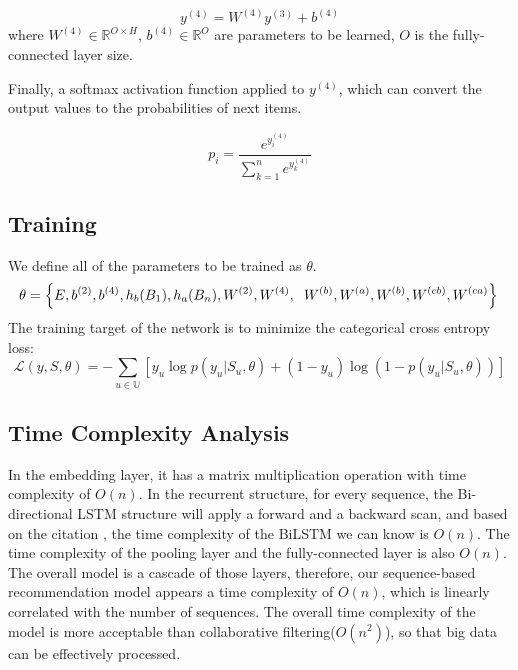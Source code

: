 \documentclass[runningheads]{llncs}
\begin{document}
\begin{equation}
y^{(4)}=W^{(4)}y^{(3)}+b^{(4)}
\end{equation}
where $W^{(4)}\in \mathbb{R}^{O\times H}$, $b^{(4)}\in \mathbb{R}^{O}$ are parameters to be learned, $O$ is the fully-connected layer size.

Finally, a softmax activation function applied to $y^{(4)}$, which can convert the output values to the probabilities of next items. 

\begin{equation}
p_{i}= \frac{e^{y_{i}^{(4)}}}{\sum_{k=1}^{n}e^{y_{k}^{(4)}}}
\end{equation}

\subsection{Training}

We define all of the parameters to be trained as $\theta $.
\begin{equation}
\theta=  \left \{ E,b^{(2)},b^{(4)},h_{b}(B_{1}),h_{a}(B_{n}),W^{(2)}, W^{(4)},\right.\\
\left.W^{(b)},W^{(a)},W^{(b)},W^{(cb)},W^{(ca)} \right \} \\
\end{equation}
The training target of the network is to minimize the categorical cross entropy loss:
\begin{equation}
\mathcal{L}(y,S,\theta )=-\sum_{u\in \mathbb{U}}[y_{u}\log p(y_{u}|S_{u},\theta)+(1-y_{u})\log (1-p(y_{u}|S_{u},\theta ))]
\end{equation}
\subsection{Time Complexity Analysis}

In the embedding layer, it has a matrix multiplication operation with time complexity of $O(n)$. In the recurrent structure, for every sequence, the Bi-directional LSTM structure will apply a forward and a backward scan, and based on the citation \cite{Sak2014Long}, the time complexity of the BiLSTM we can know is $O(n)$. The time complexity of the pooling layer and the fully-connected layer is also $O(n)$. The overall model is a cascade of those layers, therefore, our sequence-based recommendation model appears a time complexity of $O(n)$, which is linearly correlated with the number of sequences. The overall time complexity of the model is more acceptable than collaborative filtering($O(n^{2})$)\cite{Resnick:1994:GOA:192844.192905,sarwar2001item}, so that big data can be effectively processed.
\end{document}
